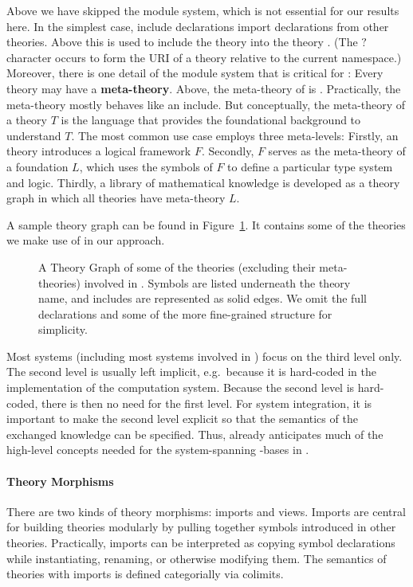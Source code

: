 Above we have skipped the \MMT module system, which is not essential for our results here.
In the simplest case, include declarations import declarations from other theories. Above this is used to include the theory  into the theory . (The $?$ character occurs to form the URI of a theory relative to the current namespace.)
Moreover, there is one detail of the \MMT module system that is critical for \pn: Every theory may have a \textbf{meta-theory}.
Above, the meta-theory of  is .
Practically, the meta-theory mostly behaves like an include.
But conceptually, the meta-theory of a theory $T$ is the language that provides the foundational background to understand $T$.
The most common use case employs three meta-levels: Firstly, an \MMT theory introduces a logical framework $F$.
Secondly, $F$ serves as the meta-theory of a foundation $L$, which uses the symbols of $F$ to define a particular type system and logic.
Thirdly, a library of mathematical knowledge is developed as a theory graph in which all theories have meta-theory $L$.

A sample theory graph can be found in Figure~\ref{fig:odk_theories}.
It contains some of the theories we make use of in our approach.

\begin{figure}[ht]\centering
  \providecommand\myxscale{3}
  \providecommand\myyscale{1.5}
  \providecommand\myfontsize{\footnotesize}
             
  \caption[Theories involved in our architecture]{A Theory Graph of some of the theories (excluding their meta-theories)
    involved in \pn.  Symbols are listed underneath the theory name, and includes are represented as solid edges.  We omit the full
    declarations and some of the more fine-grained structure for simplicity.  }
  \label{fig:odk_theories}
\end{figure}


Most systems (including most systems involved in \pn) focus on the third level only.
The second level is usually left implicit, e.g.~because it is hard-coded in the implementation of the computation system.
Because the second level is hard-coded, there is then no need for the first level.
For system integration, it is important to make the second level explicit so that the semantics of the exchanged knowledge can be specified.
Thus, \MMT already anticipates much of the high-level concepts needed for the system-spanning \DKS-bases in \pn.

\paragraph{Theory Morphisms}
There are two kinds of theory morphisms: imports and views.  Imports are central for
building theories modularly by pulling together symbols introduced in other theories.
Practically, imports can be interpreted as copying symbol declarations while
instantiating, renaming, or otherwise modifying them.  The semantics of theories with
imports is defined categorially via colimits.

